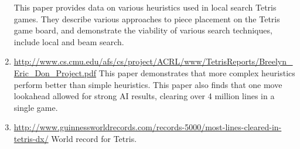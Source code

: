 \documentclass[12pt]{article}
\begin{document}
\begin{enumerate}
This paper provides data on various heuristics used in local search Tetris games. They describe various approaches to piece placement on the Tetris game board, and demonstrate the viability of various search techniques, include local and beam search.
\item \url{http://www.cs.cmu.edu/afs/cs/project/ACRL/www/TetrisReports/Breelyn_Eric_Don_Project.pdf}
This paper demonstrates that more complex heuristics perform better than simple heuristics. This paper also finds that one move lookahead allowed for strong AI results, clearing over 4 million lines in a single game.
\item \url{http://www.guinnessworldrecords.com/records-5000/most-lines-cleared-in-tetris-dx/}
World record for Tetris.
\end{enumerate}
\end{document}
